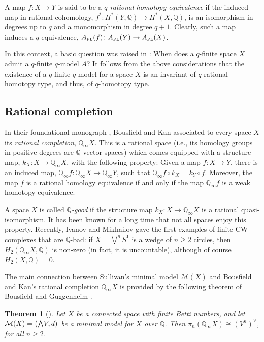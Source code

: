 \documentclass{article}
\numberwithin{equation}{section}
\newtheorem{theorem}{Theorem}[section]
\theoremstyle{definition}
\newcommand{\Q}{\mathbb{Q}}
\newcommand{\M}{\mathcal{M}}
\newcommand{\apl}{A_{\scriptscriptstyle{{\rm PL}}}}
\newcommand{\bwedge}{\mbox{\normalsize $\bigwedge$}}
\begin{document}
A map $f\colon X\to Y$ is said to be a {\em $q$-rational homotopy 
equivalence}\/ if the induced map in rational cohomology, 
$f^*\colon H^{*}(Y,\Q)\to H^{*}(X,\Q)$, is an isomorphism 
in degrees up to $q$ and a monomorphism in degree $q+1$.  
Clearly, such a map induces a $q$-equivalence,  
$\apl(f)\colon \apl(Y)\to \apl(X)$. 

In this context, a basic question was raised in \cite{PS-jlms}: 
When does a $q$-finite space $X$ admit a $q$-finite $q$-model $A$?
It follows from the above considerations that the  
existence of a $q$-finite $q$-model for a space $X$ is an invariant of 
$q$-rational homotopy type, and thus, of $q$-homotopy type.

\subsection{Rational completion}
\label{subsec:BK}

In their foundational monograph \cite{BK72}, Bousfield and Kan associated 
to every space $X$ its {\em rational completion}, $\Q_{\infty}X$. This is 
a rational space (i.e., its homology groups in positive degrees 
are $\Q$-vector spaces) which comes equipped with a structure 
map, $k_X\colon X\to \Q_{\infty}X$, with the following property: 
Given a map $f\colon X\to Y$, 
there is an induced map, $\Q_{\infty}f\colon \Q_{\infty}X\to \Q_{\infty}Y$, 
such that $\Q_{\infty}f\circ k_X=k_Y\circ f$. Moreover, the map $f$ 
is a rational homology equivalence if and only if the map 
$\Q_{\infty}f$ is a weak homotopy equivalence. 

A space $X$ is called {\em $\Q$-good}\/ if the structure map 
$k_X\colon X\to \Q_{\infty}X$ is a rational quasi-isomorphism. 
It has been known for a long time that not all spaces enjoy this property. 
Recently, Ivanov and Mikhailov \cite{IM} gave the first examples 
of finite CW-complexes that are $\Q$-bad: if $X=\bigvee^{n} S^1$ is a wedge 
of $n\ge 2$ circles, then $H_2( \Q_{\infty}X, \Q)$ is non-zero (in fact, it is 
uncountable), although of course $H_2(X,\Q)=0$.

The main connection between Sullivan's minimal model $\M(X)$ and  
Bousfield and Kan's rational completion $\Q_{\infty}X$ is provided by the 
following theorem of Bousfield and Guggenheim \cite{BG}.  %

\begin{theorem}[\cite{BG}]
\label{thm:bg-bk-sv}
Let $X$ be a connected space with finite Betti numbers, and let 
$\M(X)=\big( \bwedge V, d)$ be a minimal model for $X$ over $\Q$. 
Then $\pi_n(\Q_{\infty}X)\cong (V^n)^{\vee}$, for all $n\ge 2$.
\end{theorem}
\end{document}
